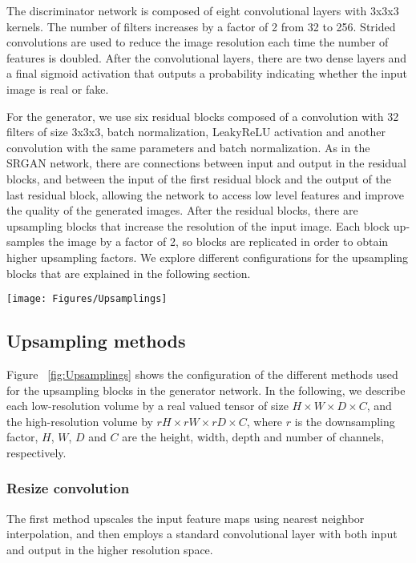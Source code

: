 \documentclass{article}
\begin{document}
The discriminator network is composed of eight convolutional layers with 3x3x3 kernels. The number of filters increases by a factor of 2 from 32 to 256. Strided convolutions are used to reduce the image resolution each time the number of features is doubled. After the convolutional layers, there are two dense layers and a final sigmoid activation that outputs a probability indicating whether the input image is real or fake.

For the generator, we use six residual blocks composed of a convolution with 32 filters of size 3x3x3, batch normalization, LeakyReLU activation and another convolution with the same parameters and batch normalization. As in the SRGAN network, there are connections between input and output in the residual blocks, and between the input of the first residual block and the output of the last residual block, allowing the network to access low level features and improve the quality of the generated images.
After the residual blocks, there are upsampling blocks that increase the resolution of the input image. Each block up-samples the image by a factor of 2, so blocks are replicated in order to obtain higher upsampling factors. We explore different configurations for the upsampling blocks that are explained in the following section.

\begin{figure*}
   \texttt{[image: Figures/Upsamplings]}
   \caption{Architecture of the different upsampling methods.}
	\label{fig:Upsamplings}
\end{figure*}

\subsection{Upsampling methods}
\label{ssec:upsampling}
Figure ~\ref{fig:Upsamplings} shows the configuration of the different methods used for the upsampling blocks in the generator network. In the following, we describe each low-resolution volume by a real valued tensor of size $H \times W \times D \times C$, and the high-resolution volume by $rH \times rW \times rD \times C$, where $r$ is the downsampling factor, $H$, $W$, $D$ and $C$ are the height, width, depth and number of channels, respectively.

\subsubsection{Resize convolution}
\label{sssec:nn}
The first method upscales the input feature maps using nearest neighbor interpolation, and then employs a standard convolutional layer with both input and output in the higher resolution space.
\end{document}
